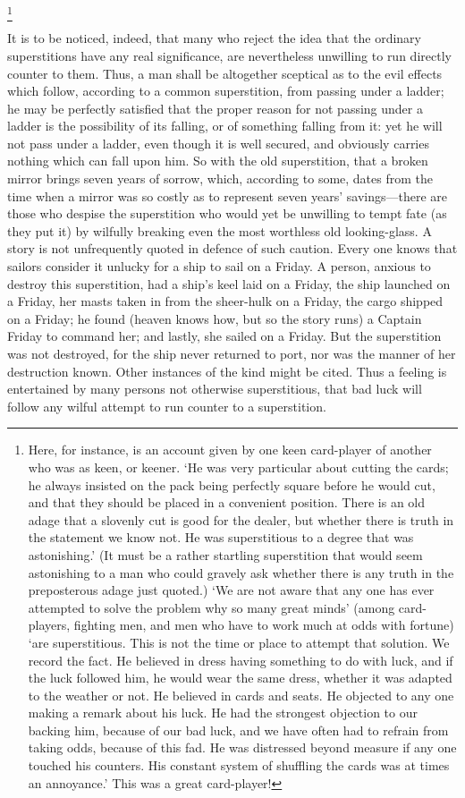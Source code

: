 \documentclass[letterpaper,12pt,oneside,openany]{memoir}
\begin{document}
\footnote{Here, for instance, is an account given by one keen card-player
of another who was as keen, or keener. `He was very particular
about cutting the cards; he always insisted on the pack being perfectly
square before he would cut, and that they should be placed
in a convenient position. There is an old adage that a slovenly cut
is good for the dealer, but whether there is truth in the statement
we know not. He was superstitious to a degree that was astonishing.'
(It must be a rather startling superstition that would seem
astonishing to a man who could gravely ask whether there is any
truth in the preposterous adage just quoted.) `We are not aware
that any one has ever attempted to solve the problem why so many
great minds' (among card-players, fighting men, and men who have
to work much at odds with fortune) `are superstitious. This is not
the time or place to attempt that solution. We record the fact.
He believed in dress having something to do with luck, and if the
luck followed him, he would wear the same dress, whether it was
adapted to the weather or not. He believed in cards and seats. He
objected to any one making a remark about his luck. He had the
strongest objection to our backing him, because of our bad luck,
and we have often had to refrain from taking odds, because of this
fad. He was distressed beyond measure if any one touched his
counters. His constant system of shuffling the cards was at times
an annoyance.' This was a great card-player!}

It is to be noticed, indeed, that many who reject the
idea that the ordinary superstitions have any real
significance, are nevertheless unwilling to run directly
counter to them. Thus, a man shall be altogether
sceptical as to the evil effects which follow, according
to a common superstition, from passing under a ladder;
he may be perfectly satisfied that the proper reason for
not passing under a ladder is the possibility of its
falling, or of something falling from it: yet he will not
pass under a ladder, even though it is well secured, and
obviously carries nothing which can fall upon him.
So with the old superstition, that a broken mirror
brings seven years of sorrow, which, according to some,
dates from the time when a mirror was so costly as to
represent seven years' savings---there are those who
despise the superstition who would yet be unwilling to
tempt fate (as they put it) by wilfully breaking even
the most worthless old looking-glass. A story is not
unfrequently quoted in defence of such caution.
Every one knows that sailors consider it unlucky for
a ship to sail on a Friday. A person, anxious to
destroy this superstition, had a ship's keel laid on a
Friday, the ship launched on a Friday, her masts taken
in from the sheer-hulk on a Friday, the cargo shipped
on a Friday; he found (heaven knows how, but so the
story runs) a Captain Friday to command her; and
lastly, she sailed on a Friday. But the superstition
was not destroyed, for the ship never returned to port,
nor was the manner of her destruction known. Other
instances of the kind might be cited. Thus a feeling
is entertained by many persons not otherwise superstitious,
that bad luck will follow any wilful attempt to
run counter to a superstition.
\end{document}
